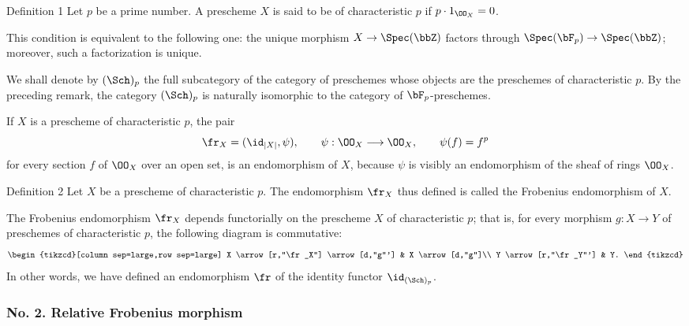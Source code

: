 \begin{statement}{Definition 1}
Let $p$ be a prime number. A prescheme $X$ is said to be of characteristic $p$ if $p\cdot 1_{\OO_X}=0$.
\end{statement}

This condition is equivalent to the following one: the unique morphism $X\to\Spec(\bbZ)$ factors through $\Spec(\bF_p)\to\Spec(\bbZ)$; moreover, such a factorization is unique.

We shall denote by $(\Sch)_p$ the full subcategory of the category of preschemes whose objects are the preschemes of characteristic $p$. By the preceding remark, the category $(\Sch)_p$ is naturally isomorphic to the category of $\bF_p$-preschemes.

If $X$ is a prescheme of characteristic $p$, the pair
\[
\fr_X=(\id_{|X|},\psi),
\qquad \psi:\OO_X\longrightarrow\OO_X,
\qquad \psi(f)=f^p
\]
for every section $f$ of $\OO_X$ over an open set, is an endomorphism of $X$, because $\psi$ is visibly an endomorphism of the sheaf of rings $\OO_X$.

\begin{statement}{Definition 2}
Let $X$ be a prescheme of characteristic $p$. The endomorphism $\fr_X$ thus defined is called the Frobenius endomorphism of $X$.
\end{statement}

The Frobenius endomorphism $\fr_X$ depends functorially on the prescheme $X$ of characteristic $p$; that is, for every morphism $g:X\to Y$ of preschemes of characteristic $p$, the following diagram is commutative:
\[
\begin{tikzcd}[column sep=large,row sep=large]
X \arrow[r,"\fr_X"] \arrow[d,"g"'] & X \arrow[d,"g"]\\
Y \arrow[r,"\fr_Y"'] & Y.
\end{tikzcd}
\]
In other words, we have defined an endomorphism $\fr$ of the identity functor $\id_{(\Sch)_p}$.

\subsubsection*{No. 2. Relative Frobenius morphism}

